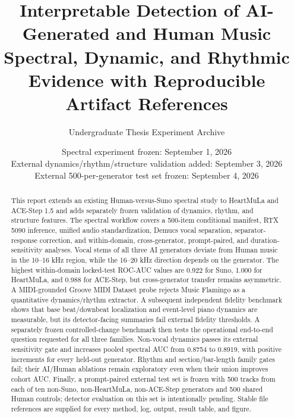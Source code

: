 \documentclass[11pt,a4paper]{article}
\title{Interpretable Detection of AI-Generated and Human Music\\
\large Spectral, Dynamic, and Rhythmic Evidence with Reproducible Artifact References}
\author{Undergraduate Thesis Experiment Archive}
\date{Spectral experiment frozen: September 1, 2026\\External dynamics/rhythm/structure validation added: September 3, 2026\\External 500-per-generator test set frozen: September 4, 2026}
\begin{document}
\maketitle

\begin{abstract}
This report extends an existing Human-versus-Suno spectral study to HeartMuLa and ACE-Step 1.5 and adds separately frozen validation of dynamics, rhythm, and structure features. The spectral workflow covers a 500-item conditional manifest, RTX 5090 inference, unified audio standardization, Demucs vocal separation, separator-response correction, and within-domain, cross-generator, prompt-paired, and duration-sensitivity analyses. Vocal stems of all three AI generators deviate from Human music in the 10--16 kHz region, while the 16--20 kHz direction depends on the generator. The highest within-domain locked-test ROC-AUC values are 0.922 for Suno, 1.000 for HeartMuLa, and 0.988 for ACE-Step, but cross-generator transfer remains asymmetric. A MIDI-grounded Groove MIDI Dataset probe rejects Music Flamingo as a quantitative dynamics/rhythm extractor. A subsequent independent fidelity benchmark shows that base beat/downbeat localization and event-level piano dynamics are measurable, but its detector-facing summaries fail external fidelity thresholds. A separately frozen controlled-change benchmark then tests the operational end-to-end question requested for all three families. Non-vocal dynamics passes its external sensitivity gate and increases pooled spectral AUC from 0.8754 to 0.8919, with positive increments for every held-out generator. Rhythm and section/bar-length family gates fail; their AI/Human ablations remain exploratory even when their union improves cohort AUC. Finally, a prompt-paired external test set is frozen with 500 tracks from each of ten non-Suno, non-HeartMuLa, non-ACE-Step generators and 500 shared Human controls; detector evaluation on this set is intentionally pending. Stable file references are supplied for every method, log, output, result table, and figure.
\end{abstract}

\noindent{}
\end{document}
